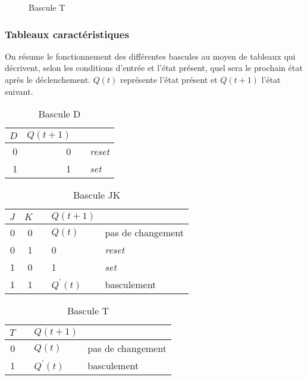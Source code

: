 \documentclass[11pt]{article}
\begin{document}
\begin{figure}[htbp]
\centering

\caption{\label{fig:org4e90590}Bascule T}
\end{figure}

\subsubsection{Tableaux caractéristiques}
\label{sec:orgdad8f4b}

On résume le fonctionnement des différentes bascules au moyen de
tableaux qui décrivent, selon les conditions d'entrée et l'état
présent, quel sera le prochain état après le déclenchement. \(Q(t)\)
représente l'état présent et \(Q(t+1)\) l'état suivant.

\begin{table}[htbp]
\caption{\label{tab:org2a75985}Bascule D}
\centering
\begin{tabular}{rrll}
\(D\) & \(Q(t+1)\) &  & \\
\hline
0 & 0 &  & \emph{reset}\\
1 & 1 &  & \emph{set}\\
\end{tabular}
\end{table}

\begin{table}[htbp]
\caption{\label{tab:org37abae7}Bascule JK}
\centering
\begin{tabular}{rrlll}
\(J\) & \(K\) &  & \(Q(t+1)\) & \\
\hline
0 & 0 &  & \(Q(t)\) & pas de changement\\
0 & 1 &  & 0 & \emph{reset}\\
1 & 0 &  & 1 & \emph{set}\\
1 & 1 &  & \(Q^\prime(t)\) & basculement\\
\end{tabular}
\end{table}

\begin{table}[htbp]
\caption{\label{tab:org6bba34a}Bascule T}
\centering
\begin{tabular}{rlll}
\(T\) &  & \(Q(t+1)\) & \\
\hline
0 &  & \(Q(t)\) & pas de changement\\
1 &  & \(Q^\prime(t)\) & basculement\\
\end{tabular}
\end{table}
\end{document}
